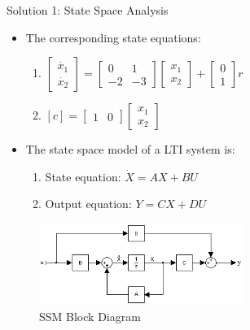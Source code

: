 \documentclass{beamer}
\begin{document}
\begin{frame}{Solution 1: State Space Analysis}
\begin{itemize}
    \item The corresponding state equations:\vspace{5}
    \begin{enumerate}
        \item $\begin{bmatrix}
\dot{x_1}\\
\dot{x_2}
\end{bmatrix} = \begin{bmatrix}
0 & 1\\
-2 & -3
\end{bmatrix} \begin{bmatrix}
x_1\\
x_2
\end{bmatrix} + \begin{bmatrix}
0\\
1
\end{bmatrix}r$
        \item $ [c] = \begin{bmatrix}
1 & 0
\end{bmatrix}\begin{bmatrix}
x_1\\
x_2
\end{bmatrix}$
    \end{enumerate}
    \item The state space model of a LTI system is:
    \begin{enumerate}
        \item State equation: $\dot{X} = AX + BU$
        \item Output equation: $Y = CX + DU$ 
    \end{enumerate}
\end{itemize}
\begin{figure}
\includegraphics[width=250]{ssm.png}
\caption{\label{fig:ssm.png}SSM Block Diagram}
\end{figure}
\end{frame}
\end{document}
